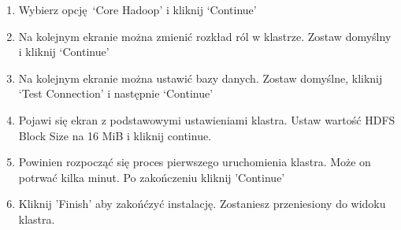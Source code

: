 \documentclass[11pt]{article}
\begin{document}
\begin{enumerate}
\item Wybierz opcję ‘Core Hadoop’ i kliknij ‘Continue’
\item Na kolejnym ekranie można zmienić rozkład ról w klastrze. Zostaw domyślny i kliknij ‘Continue’
\item Na kolejnym ekranie można ustawić bazy danych. Zostaw domyślne, kliknij ‘Test Connection’ i następnie ‘Continue’
\item Pojawi się ekran z podstawowymi ustawieniami klastra. Ustaw wartość HDFS Block Size  na 16 MiB i kliknij continue.
\item Powinien rozpocząć się proces pierwszego uruchomienia klastra. Może on potrwać kilka minut. Po zakończeniu kliknij 'Continue'
\item Kliknij 'Finish' aby zakońćzyć instalację. Zostaniesz przeniesiony do widoku klastra.
\end{enumerate}
\end{document}
